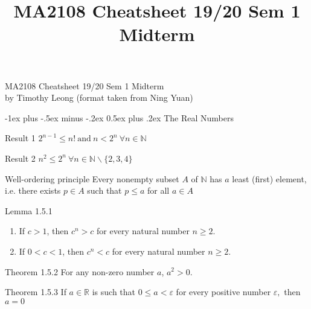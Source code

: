 \documentclass[10pt,landscape]{article}
\title{MA2108 Cheatsheet 19/20 Sem 1 Midterm}
\makeatletter
\renewcommand{\section}{\@startsection{section}{1}{0mm}%
                                {-1ex plus -.5ex minus -.2ex}%
                                {0.5ex plus .2ex}%
                                {\normalfont\large\bfseries}}
\theoremstyle{definition}
\newcommand{\thistheoremname}{}
\newtheorem*{genericthm*}{\thistheoremname}
\newenvironment{namedthm*}[1]
{\renewcommand{\thistheoremname}{#1}\begin{genericthm*}}
{\end{genericthm*}}
\makeatother
\begin{document}
\begin{center}
{\large MA2108 Cheatsheet 19/20 Sem 1 Midterm}\\{by Timothy Leong (format taken from Ning Yuan)}
\end{center}

\raggedright
\footnotesize

\begin{multicols}{3}

\setlength{\premulticols}{1pt}
\setlength{\postmulticols}{1pt}
\setlength{\multicolsep}{1pt}
\setlength{\columnsep}{2pt}

\section{The Real Numbers}

\begin{namedthm*}{Result 1}
    $2^{n-1} \leq n!~ \text{and} ~ n < 2^{n}~\forall n \in \mathbb{N}$
\end{namedthm*}

\begin{namedthm*}{Result 2}
    $n^{2} \leq 2^{n}~\forall n \in \mathbb{N} \backslash \{2,3,4\}$
\end{namedthm*}

\begin{namedthm*}{Well-ordering principle}
  Every nonempty subset $A$ of $\mathbb{N}$ has $a$ least (first) element,
i.e. there exists $p \in A$ such that $p \leq a$ for all $a \in A$
\end{namedthm*}

\begin{namedthm*}{Lemma 1.5.1}
~
 \begin{enumerate}
    \item If $c > 1$, then $c^{n} > c$ for every natural number $n \geq 2$.
    \item If $0 < c < 1$, then $c^{n} < c$ for every natural number $n \geq 2$.
    \end{enumerate}
\end{namedthm*}

\begin{namedthm*}{Theorem 1.5.2}
    For any non-zero number $a$, $a^{2} > 0$.
\end{namedthm*}
\begin{namedthm*}{Theorem 1.5.3}
    If $a \in \mathbb{R}$ is such that $0 \leq a< \varepsilon$ for every positive number $\varepsilon,$ then $a=0$
\end{namedthm*}


\end{multicols}
\end{document}

